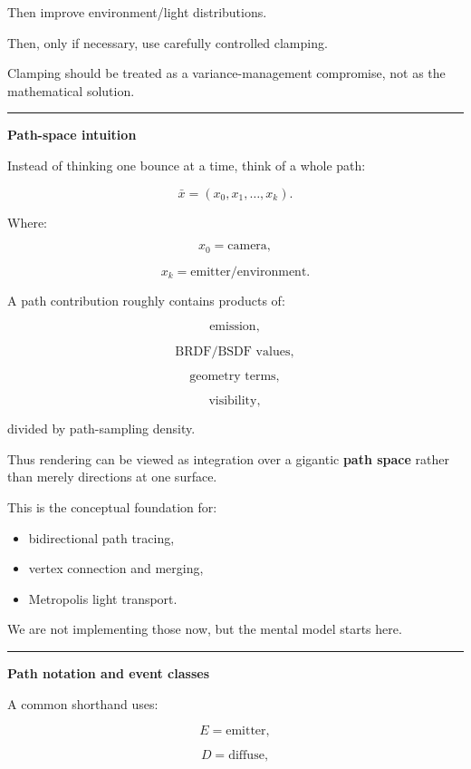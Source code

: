 Then improve environment/light distributions.

Then, only if necessary, use carefully controlled clamping.

Clamping should be treated as a variance-management compromise, not as the mathematical solution.

\begin{center}\rule{0.5\linewidth}{0.5pt}\end{center}

\textbf{Path-space intuition}

Instead of thinking one bounce at a time, think of a whole path:

\[
\boxed{
\bar x
=
(x_0,x_1,\dots,x_k).
}
\]

Where:

\[
x_0=\text{camera},
\]

\[
x_k=\text{emitter/environment}.
\]

A path contribution roughly contains products of:

\[
\text{emission},
\]

\[
\text{BRDF/BSDF values},
\]

\[
\text{geometry terms},
\]

\[
\text{visibility},
\]

divided by path-sampling density.

Thus rendering can be viewed as integration over a gigantic \textbf{path space} rather than merely directions at one surface.

This is the conceptual foundation for:

\begin{itemize}
\tightlist
\item
  bidirectional path tracing,
\item
  vertex connection and merging,
\item
  Metropolis light transport.
\end{itemize}

We are not implementing those now, but the mental model starts here.

\begin{center}\rule{0.5\linewidth}{0.5pt}\end{center}

\textbf{Path notation and event classes}

A common shorthand uses:

\[
E=\text{emitter},
\]

\[
D=\text{diffuse},
\]

